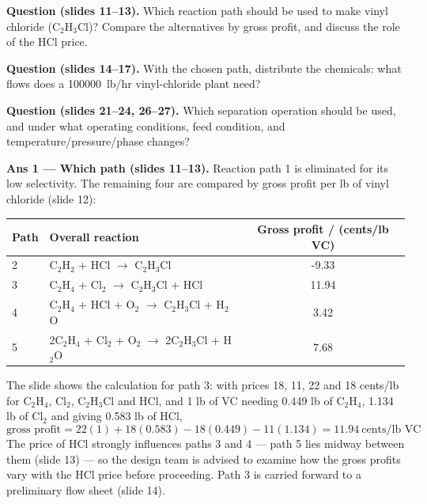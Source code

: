 \documentclass[10pt,a4paper]{article}
\begin{document}
\begin{qbox}
\textbf{Question (slides 11--13).} Which reaction path should be used to make vinyl chloride (C$_2$H$_3$Cl)? Compare the alternatives by gross profit, and discuss the role of the HCl price.

\textbf{Question (slides 14--17).} With the chosen path, distribute the chemicals: what flows does a \SI{100000}{lb/hr} vinyl-chloride plant need?

\textbf{Question (slides 21--24, 26--27).} Which separation operation should be used, and under what operating conditions, feed condition, and temperature/pressure/phase changes?
\end{qbox}

\begin{ansbox}
\textbf{Ans 1 --- Which path (slides 11--13).} Reaction path 1 is eliminated for its low selectivity. The remaining four are compared by gross profit per lb of vinyl chloride (slide 12):
\begin{center}\small
\begin{tabular}{@{}l l S[table-format=-1.2]@{}}
\toprule
Path & Overall reaction & {Gross profit / (cents/lb VC)}\\
 & C$_2$H$_2$ + HCl $\rightarrow$ C$_2$H$_3$Cl & -9.33\\
3 & C$_2$H$_4$ + Cl$_2$ $\rightarrow$ C$_2$H$_3$Cl + HCl & 11.94\\
4 & C$_2$H$_4$ + HCl + O$_2$ $\rightarrow$ C$_2$H$_3$Cl + H$_2$O & 3.42\\
5 & 2C$_2$H$_4$ + Cl$_2$ + O$_2$ $\rightarrow$ 2C$_2$H$_3$Cl + H$_2$O & 7.68\\
\bottomrule
\end{tabular}
\end{center}
The slide shows the calculation for path 3: with prices 18, 11, 22 and 18 cents/lb for C$_2$H$_4$, Cl$_2$, C$_2$H$_3$Cl and HCl, and 1 lb of VC needing 0.449 lb of C$_2$H$_4$, 1.134 lb of Cl$_2$ and giving 0.583 lb of HCl,
\[\text{gross profit}=22(1)+18(0.583)-18(0.449)-11(1.134)=11.94\ \text{cents/lb VC}\]
The price of HCl strongly influences paths 3 and 4 --- path 5 lies midway between them (slide 13) --- so the design team is advised to examine how the gross profits vary with the HCl price before proceeding. Path 3 is carried forward to a preliminary flow sheet (slide 14).


\end{ansbox}
\end{document}
